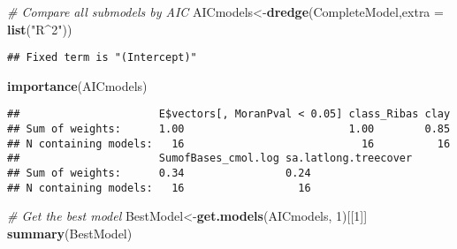 \documentclass[]{article}
\newenvironment{Shaded}{\begin{snugshade}}{\end{snugshade}}
\newcommand{\CommentTok}[1]{\textcolor[rgb]{0.56,0.35,0.01}{\textit{#1}}}
\newcommand{\DataTypeTok}[1]{\textcolor[rgb]{0.13,0.29,0.53}{#1}}
\newcommand{\DecValTok}[1]{\textcolor[rgb]{0.00,0.00,0.81}{#1}}
\newcommand{\KeywordTok}[1]{\textcolor[rgb]{0.13,0.29,0.53}{\textbf{#1}}}
\newcommand{\NormalTok}[1]{#1}
\newcommand{\StringTok}[1]{\textcolor[rgb]{0.31,0.60,0.02}{#1}}
\begin{document}
\begin{Shaded}
\begin{Highlighting}[]
\CommentTok{# Compare all submodels by AIC  }
\NormalTok{AICmodels<-}\KeywordTok{dredge}\NormalTok{(CompleteModel,}\DataTypeTok{extra =} \KeywordTok{list}\NormalTok{(}\StringTok{"R^2"}\NormalTok{))}
\end{Highlighting}
\end{Shaded}

\begin{verbatim}
## Fixed term is "(Intercept)"
\end{verbatim}

\begin{Shaded}
\begin{Highlighting}[]
\KeywordTok{importance}\NormalTok{(AICmodels)}
\end{Highlighting}
\end{Shaded}

\begin{verbatim}
##                      E$vectors[, MoranPval < 0.05] class_Ribas clay
## Sum of weights:      1.00                          1.00        0.85
## N containing models:   16                            16          16
##                      SumofBases_cmol.log sa.latlong.treecover
## Sum of weights:      0.34                0.24                
## N containing models:   16                  16
\end{verbatim}

\begin{Shaded}
\begin{Highlighting}[]
\CommentTok{# Get the best model}
\NormalTok{BestModel<-}\KeywordTok{get.models}\NormalTok{(AICmodels, }\DecValTok{1}\NormalTok{)[[}\DecValTok{1}\NormalTok{]]}
\KeywordTok{summary}\NormalTok{(BestModel)}
\end{Highlighting}
\end{Shaded}
\end{document}
